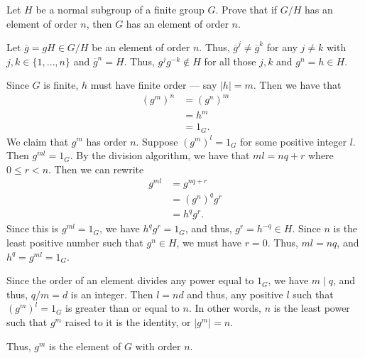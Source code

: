 \documentclass[12 pt, letterpaper]{hmcpset}
\begin{document}
\pagebreak

\begin{problem}[4.]
	Let $H$ be a normal subgroup of a finite group $G$. Prove that if $G/H$ has an element of order $n$, then $G$ has an element of order $n$.
\end{problem}

\begin{solution}
	Let $\overline{g} = gH \in G/H$ be an element of order $n$. Thus, $\overline{g}^{j} \neq \overline{g}^{k}$ for any $j \neq k$ with $j, k \in \{ 1, \dots, n \}$ and $\overline{g}^{n} = H$. Thus, $g^{j} g^{-k} \notin H$ for all those $j, k$ and $g^{n} = h \in H$. 

	Since $G$ is finite, $h$ must have finite order --- say $\lvert h  \rvert = m$. Then we have that
	\[
		\begin{split}
			(g^{m})^{n} & = (g^{n})^{m} \\
				    & = h^{m} \\
				    & = 1_{G}.
		\end{split}
	\]
	We claim that $g^{m}$ has order $n$. Suppose $(g^{m})^{l} = 1_{G}$ for some positive integer $l$. Then $g^{ml} = 1_{G}$. By the division algorithm, we have that $ml = nq + r$ where $0 \le r < n$. Then we can rewrite
	\[
		\begin{split}
			g^{ml} & = g^{nq + r} \\
			       & = (g^{n})^{q} g^{r} \\
			       & = h^{q} g^{r}.
		\end{split} 
	\]
	Since this is $g^{ml} = 1_{G}$, we have $h^{q} g^{r} = 1_{G}$, and thus, $g^{r} = h^{-q} \in H$. Since $n$ is the least positive number such that $g^{n} \in H$, we must have $r = 0$. Thus, $ml = nq$, and $h^{q} = g^{ml} = 1_{G}$. 

	Since the order of an element divides any power equal to $1_{G}$, we have $m \mid q$, and thus, $q/m = d$ is an integer. Then $l = nd$ and thus, any positive $l$ such that $(g^{m})^{l} = 1_{G}$ is greater than or equal to $n$. In other words, $n$ is the least power such that $g^{m}$ raised to it is the identity, or $\lvert g^{m} \rvert = n$. 

	Thus, $g^{m}$ is the element of $G$ with order $n$.
\end{solution}

\pagebreak
\end{document}

